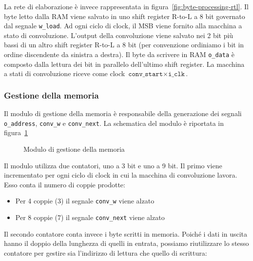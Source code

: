 \documentclass[a4paper,11pt]{article}
\begin{document}
La rete di elaborazione è invece rappresentata in
figura~\ref{fig:byte-processing-rtl}. Il byte letto dalla RAM viene salvato in
uno shift register R-to-L a 8 bit governato dal segnale \texttt{w\_load}. Ad
ogni ciclo di clock, il MSB viene fornito alla macchina a stato di convoluzione.
L'output della convoluzione viene salvato nei 2 bit più bassi di un altro shift
register R-to-L a 8 bit (per convenzione ordiniamo i bit in ordine discendente
da sinistra a destra). Il byte da scrivere in RAM \texttt{o\_data} è composto
dalla lettura dei bit in parallelo dell'ultimo shift register. La macchina a
stati di convoluzione riceve come clock
$\texttt{conv\_start}\times\texttt{i\_clk}$.

\subsubsection{Gestione della memoria}

Il modulo di gestione della memoria è responsabile della generazione dei segnali
\texttt{o\_address}, \texttt{conv\_w} e \texttt{conv\_next}. La schematica del
modulo è riportata in figura~\ref{fig:memory-management-rtl}

\begin{figure}[htb]
  \centering
  \caption{Modulo di gestione della memoria}%
  \label{fig:memory-management-rtl}
\end{figure}

Il modulo utilizza due contatori, uno a 3 bit e uno a 9 bit. Il primo viene
incrementato per ogni ciclo di clock in cui la macchina di convoluzione lavora.
Esso conta il numero di coppie prodotte:

\begin{itemize}
  \item Per 4 coppie (3) il segnale \texttt{conv\_w} viene alzato
  \item Per 8 coppie (7) il segnale \texttt{conv\_next} viene alzato
\end{itemize}

Il secondo contatore conta invece i byte scritti in memoria. Poiché i dati in
uscita hanno il doppio della lunghezza di quelli in entrata, possiamo
riutilizzare lo stesso contatore per gestire sia l'indirizzo di lettura che
quello di scrittura:
\end{document}
